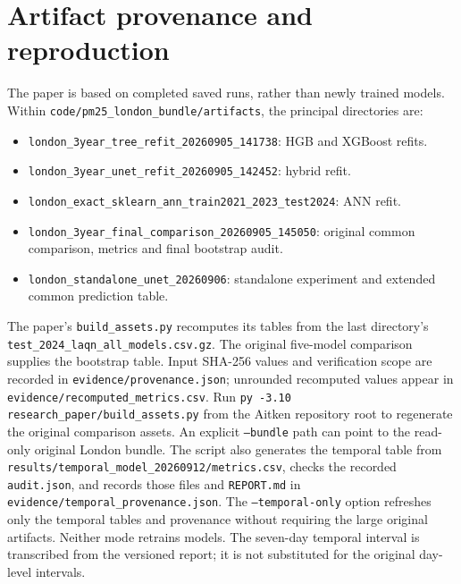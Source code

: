 \documentclass[11pt,a4paper]{article}
\begin{document}



\clearpage
\appendix
\section{Artifact provenance and reproduction}
The paper is based on completed saved runs, rather than newly trained models.
Within \texttt{code/pm25\_london\_bundle/artifacts}, the principal directories are:
\begin{itemize}
\item \nolinkurl{london_3year_tree_refit_20260905_141738}: HGB and XGBoost refits.
\item \nolinkurl{london_3year_unet_refit_20260905_142452}: hybrid refit.
\item \nolinkurl{london_exact_sklearn_ann_train2021_2023_test2024}: ANN refit.
\item \nolinkurl{london_3year_final_comparison_20260905_145050}: original common
comparison, metrics and final bootstrap audit.
\item \nolinkurl{london_standalone_unet_20260906}: standalone experiment and
extended common prediction table.
\end{itemize}
The paper's \nolinkurl{build_assets.py} recomputes its tables from the last
directory's \nolinkurl{test_2024_laqn_all_models.csv.gz}. The original
five-model comparison supplies the bootstrap table. Input SHA-256 values and
verification scope are recorded in \nolinkurl{evidence/provenance.json};
unrounded recomputed values appear in \nolinkurl{evidence/recomputed_metrics.csv}.
Run \texttt{py -3.10 research\_paper/build\_assets.py} from the Aitken repository
root to regenerate the original comparison assets. An explicit
\texttt{--bundle} path can point to the read-only original London bundle.
The script also generates the temporal table from
\nolinkurl{results/temporal_model_20260912/metrics.csv}, checks the recorded
\nolinkurl{audit.json}, and records those files and \nolinkurl{REPORT.md}
in \nolinkurl{evidence/temporal_provenance.json}. The
\texttt{--temporal-only} option refreshes only the temporal tables and
provenance without requiring the large original artifacts. Neither mode
retrains models. The seven-day temporal interval is transcribed from the
versioned report; it is not substituted for the original day-level intervals.
\end{document}
